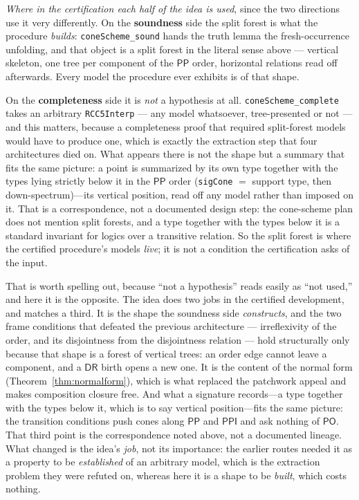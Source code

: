 \documentclass[11pt]{article}
\newcommand{\DR}{\mathsf{DR}}
\newcommand{\PO}{\mathsf{PO}}
\newcommand{\PP}{\mathsf{PP}}
\newcommand{\PPI}{\mathsf{PPI}}
\newcommand{\code}[1]{\texttt{#1}}
\theoremstyle{plain}
\theoremstyle{definition}
\begin{document}
\emph{Where in the certification each half of the idea is used}, since the two
directions use it very differently. On the \textbf{soundness} side the split
forest is what the procedure \emph{builds}: \code{coneScheme\_sound} hands the
truth lemma the fresh-occurrence unfolding, and that object is a split forest in
the literal sense above --- vertical skeleton, one tree per component of the
$\PP$ order, horizontal relations read off afterwards. Every model the procedure
ever exhibits is of that shape.

On the \textbf{completeness} side it is \emph{not} a hypothesis at all.
\code{coneScheme\_complete} takes an arbitrary \code{RCC5Interp} --- any model
whatsoever, tree-presented or not --- and this matters, because a completeness
proof that required split-forest models would have to produce one, which is
exactly the extraction step that four architectures died on. What appears there
is not the shape but a summary that fits the same picture: a point is summarized
by its own type together with the types lying strictly below it in the $\PP$
order (\code{sigCone} $=$ support type, then down-spectrum)---its vertical
position, read off any model rather than imposed on it. That is a
correspondence, not a documented design step: the cone-scheme plan does not
mention split forests, and a type together with the types below it is a
standard invariant for logics over a transitive relation. So the split forest is where
the certified procedure's models \emph{live}; it is not a condition the
certification asks of the input.

That is worth spelling out, because ``not a hypothesis'' reads easily as ``not
used,'' and here it is the opposite. The idea does two jobs in the certified
development, and matches a third. It is the shape the soundness side \emph{constructs}, and the two
frame conditions that defeated the previous architecture --- irreflexivity of
the order, and its disjointness from the disjointness relation --- hold
structurally only because that shape is a forest of vertical trees: an order
edge cannot leave a component, and a $\DR$ birth opens a new one. It is the
content of the normal form (Theorem~\ref{thm:normalform}), which is what
replaced the patchwork appeal and makes composition closure free. And what a
signature records---a type together with the types below it, which is to say
vertical position---fits the same picture: the transition conditions push cones
along $\PP$ and $\PPI$ and ask nothing of $\PO$. That third point is the
correspondence noted above, not a documented lineage. What changed is the idea's \emph{job}, not its
importance: the earlier routes needed it as a property to be \emph{established}
of an arbitrary model, which is the extraction problem they were refuted on,
whereas here it is a shape to be \emph{built}, which costs nothing.
\end{document}
